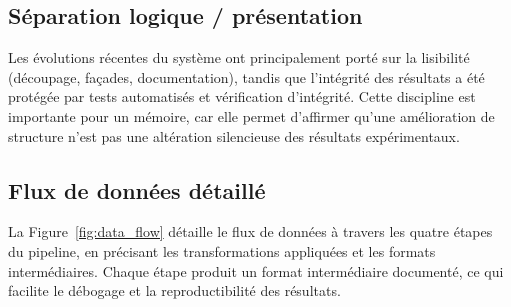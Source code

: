 \subsection{Séparation logique / présentation}
Les évolutions récentes du système ont principalement porté sur la lisibilité (découpage,
façades, documentation), tandis que l'intégrité des résultats a été protégée par tests
automatisés et vérification d'intégrité. Cette discipline est importante pour un mémoire,
car elle permet d'affirmer qu'une amélioration de structure n'est pas une altération
silencieuse des résultats expérimentaux.

\subsection{Flux de données détaillé}
La Figure~\ref{fig:data_flow} détaille le flux de données à travers les quatre étapes
du pipeline, en précisant les transformations appliquées et les formats intermédiaires.
Chaque étape produit un format intermédiaire documenté, ce qui facilite le débogage et
la reproductibilité des résultats.

